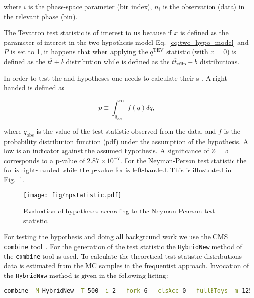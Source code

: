 \noindent where $i$ is the phase-space parameter (bin index), $n_{i}$ is the observation (data) in the relevant phase (bin).

The Tevatron test statistic is of interest to us because if $x$ is defined as the parameter of interest in the two hypothesis model Eq.~\ref{eq:two_hypo_model} and $P$ is set to 1, it happens  that when applying the $q^{\text{TEV}}$ statistic \Hnull (with $x=0$) is defined as the $t\overline{t}+b$ distribution while \Halt is defined as the $t\overline{t}_{\text{cflip}}+b$ distributions.

In order to test the \Hnull and \Halt hypotheses one needs to calculate their \pval s . A right-handed \pval is defined as

\begin{equation}
p\equiv\int_{q_{\text{obs}}}^{\infty}f(q)dq,
\end{equation}
    
\noindent where $q_{\text{obs}}$ is the value of the test statistic observed from the data, and $f$ is the probability distribution function (pdf) under the assumption of the hypothesis. A low \pval is an indicator against the assumed hypothesis. A significance of $Z=5$ corresponds to a p-value of $2.87\times10^{-7}$. For the Neyman-Person test statistic the \pval for \Hnull is right-handed while the p-value for \Halt is left-handed. This is illustrated in Fig.~\ref{fig:npstatistic}.

\begin{figure}
  \centering
  \texttt{[image: fig/npstatistic.pdf]}
  \caption{Evaluation of hypotheses according to the Neyman-Pearson test statistic.}
  \label{fig:npstatistic}
\end{figure}

For testing the hypothesis and doing all background work we use the CMS \lstinline[language=sh]|combine| tool~\cite{url:combine}. For the generation of the test statistic the \lstinline[language=sh]|HybridNew| method of the \lstinline[language=sh]|combine| tool is used. To calculate the theoretical test statistic distributions data is estimated from the MC samples in the frequentist approach. Invocation of the \lstinline[language=sh]|HybridNew| method is given in the following listing:

\begin{lstlisting}[language=sh, breaklines=true]
  combine -M HybridNew -T 500 -i 2 --fork 6 --clsAcc 0 --fullBToys -m 125.7 TwoHypo.root --seed 8192 --testStat=TEV  --saveHybridResult --singlePoint 1
\end{lstlisting}

